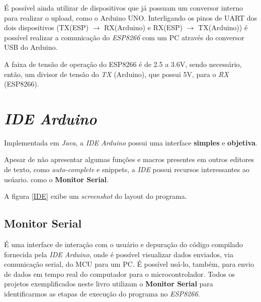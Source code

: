 \documentclass[
	11pt,				%
	openright,			%
	twoside,			%
	a5paper,			%
	english,			%
	french,				%
	spanish,			%
	brazil,				%
	sumario=tradicional
]{abntex2}
\begin{document}
É possível ainda utilizar de dispositivos que já possuam um conversor interno para realizar o upload, como o Arduino UNO. Interligando os pinos de UART dos dois dispositivos (TX(ESP) $\rightarrow$ RX(Arduino) e RX(ESP) $\rightarrow$ TX(Arduino)) é possível realizar a comunicação do \textit{ESP8266} com um PC através do conversor USB do Arduino.

\vspace{10pt}

\begin{tcolorbox}[colbacktitle=yellow!60!white,
title={\vspace{-13pt}\texttt{[image: exclamacao.png]} \hspace{2pt} \textsf{\textbf{ATENÇÃO!}\vspace{2pt}}},coltitle=black, colback=white,arc=4mm, outer arc=3.5mm]
\raggedright
 A faixa de tensão de operação do ESP8266 é de \textsf{2.5} a \textsf{3.6V}, sendo necessário, então, um divisor de tensão do \textit{TX} (Arduino), que possui \textsf{5V}, para o \textit{RX} (ESP8266).
\end{tcolorbox}

\section{\textit{IDE Arduino}}

Implementada em \textit{Java}, a \textit{IDE Arduino} possui uma interface \textbf{\textsf{simples}} e \textbf{\textsf{objetiva}}.

Apesar de não apresentar algumas funções e macros presentes em outros editores de texto, como \textit{auto-complete} e snippets, a \textit{IDE} possui recursos interessantes ao usúario. como o \textbf{\textsf{Monitor Serial}}.

A figura \ref{IDE} exibe um \textit{screenshot} do layout do programa.
\\


\subsection{Monitor Serial}
    
    É uma interface de interação com o usuário e depuração do código compilado fornecida pela \textit{\textsf{IDE Arduino}}, onde é possível visualizar dados enviados, via comunicação serial, do MCU para um PC. É possível usá-lo, também, para envio de dados em tempo real do computador para o microcontrolador. Todos os projetos exemplificados neste livro utilizam o \textsf{\textbf{Monitor Serial}} para identificarmos as etapas de execução do programa no \textit{ESP8266}.
    
\end{document}
